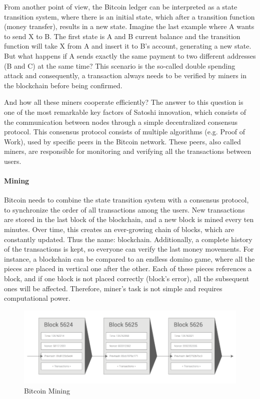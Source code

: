 From another point of view, the Bitcoin ledger can be interpreted as a state transition system, where there is an initial state, which after a transition function (money transfer), results in a new state. Imagine the last example where A wants to send X to B. The first state is A and B current balance and the transition function will take X from A and insert it to B's account, generating a new state. But what happens if A sends exactly the same payment to two different addresses (B and C) at the same time? This scenario is the so-called double spending attack and consequently, a transaction always needs to be verified by miners in the blockchain before being confirmed.

And how all these miners cooperate efficiently? The answer to this question is one of the most remarkable key factors of Satoshi innovation, which consists of the communication between nodes through a simple decentralized consensus protocol. This consensus protocol consists of multiple algorithms (e.g. Proof of Work), used by specific peers in the Bitcoin network. These peers, also called miners, are responsible for monitoring and verifying all the transactions between users.

\paragraph{Mining}

Bitcoin needs to combine the state transition system with a consensus protocol, to synchronize the order of all transactions among the users.
New transactions are stored in the last block of the blockchain, and a new block is mined every ten minutes. Over time, this creates an ever-growing chain of blocks, which are constantly updated. Thus the name: blockchain. Additionally, a complete history of the transactions is kept, so everyone can verify the last money movements. For instance, a blockchain can be compared to an endless domino game, where all the pieces are placed in vertical one after the other. Each of these pieces references a block, and if one block is not placed correctly (block's error), all the subsequent ones will be affected. Therefore, miner's task is not simple and requires computational power.

\begin{figure}
  \centering
  	\includegraphics[scale=0.5]{gfx/mining.png}
  \caption{Bitcoin Mining}
  \label{fig:Bitcoin mining}
\end{figure}

